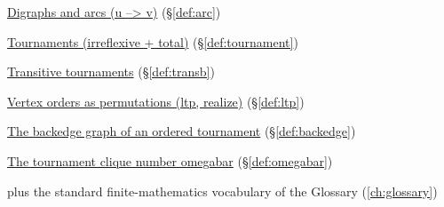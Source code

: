 \begin{closurepanel}
\item \hyperref[def:arc]{Digraphs and arcs (u --> v)} (\S\ref*{def:arc})
\item \hyperref[def:tournament]{Tournaments (irreflexive + total)} (\S\ref*{def:tournament})
\item \hyperref[def:transb]{Transitive tournaments} (\S\ref*{def:transb})
\item \hyperref[def:ltp]{Vertex orders as permutations (ltp, realize)} (\S\ref*{def:ltp})
\item \hyperref[def:backedge]{The backedge graph of an ordered tournament} (\S\ref*{def:backedge})
\item \hyperref[def:omegabar]{The tournament clique number omegabar} (\S\ref*{def:omegabar})
\item plus the standard finite-mathematics vocabulary of the Glossary (\cref{ch:glossary})
\end{closurepanel}
